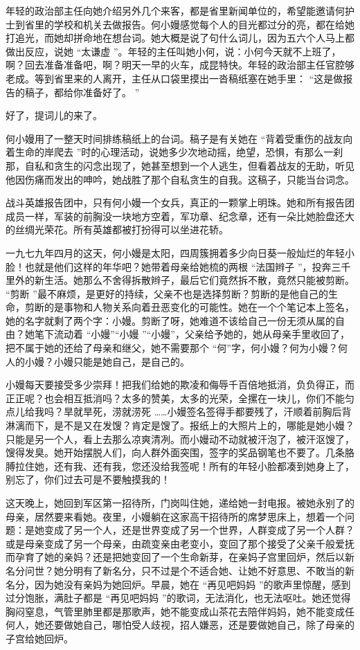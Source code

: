 \documentclass[12pt,twoside,openany]{book}
\begin{document}
年轻的政治部主任向她介绍另外几个来客，都是省里新闻单位的，希望能邀请何护士到省里的学校和机关去做报告。何小嫚感觉每个人的目光都过分的亮，都在给她打追光，而她却拼命地在想台词。她大概是说了句什么词儿，因为五六个人马上都做出反应，说她 “太谦虚 ”。年轻的主任叫她小何，说：小何今天就不上班了，啊？回去准备准备吧，啊？明天一早的火车，成昆特快。年轻的政治部主任官腔够老成。等到省里来的人离开，主任从口袋里摸出一沓稿纸塞在她手里： “这是做报告的稿子，都给你准备好了。 ”

好了，提词儿的来了。

何小嫚用了一整天时间排练稿纸上的台词。稿子是有关她在 “背着受重伤的战友向着生命的岸爬去 ”时的心理活动，说她多少次地动摇，绝望，恐惧，有那么一刹那，自私和贪生的闪念出现了，她甚至想到一个人逃生，但看着战友的无助，听见他因伤痛而发出的呻吟，她战胜了那个自私贪生的自我。这稿子，只能当台词念。

战斗英雄报告团中，只有何小嫚一个女兵，真正的一颗掌上明珠。她和所有报告团成员一样，军装的前胸没一块地方空着，军功章、纪念章，还有一朵比她脸盘还大的丝绸光荣花。所有英雄都被打扮得可以坐进花轿。

一九七九年四月的这天，何小嫚是太阳，四周簇拥着多少向日葵一般灿烂的年轻小脸！也就是他们这样的年华吧？她带着母亲给她梳的两根 “法国辫子 ”，投奔三千里外的新生活。她那么不舍得拆散辫子，最后它们竟然拆不散，竟然只能被剪断。 “剪断 ”最不麻烦，是更好的持续，父亲不也是选择剪断？剪断的是他自己的生命，剪断的是事物和人物关系向着丑恶变化的可能性。她在一个个笔记本上签名，她的名字就剩了两个字：小嫚。剪断了呀，她难道不该给自己一份无须从属的自由？她笔下流动着 “小嫚”“小嫚 ”“小嫚”，父亲给予她的，她从母亲手里收回了，把不属于她的还给了母亲和继父，她不需要那个 “何”字，何小嫚？何为小嫚？何人的小嫚？小嫚只能是她自己，是自己的。

小嫚每天要接受多少崇拜！把我们给她的欺凌和侮辱千百倍地抵消，负负得正，而正正呢？也会相互抵消吗？太多的赞美，太多的光荣，全摞在一块儿，你们不能匀点儿给我吗？旱就旱死，涝就涝死 ……小嫚签名签得手都要残了，汗顺着前胸后背淋漓而下，是不是又在发馊？肯定是馊了。报纸上的大照片上的，哪能是她小嫚？只能是另一个人，看上去那么凉爽清冽。而小嫚动不动就被汗泡了，被汗沤馊了，馊得发臭。她开始摆脱人们，向人群外面突围，签字的奖品钢笔也不要了。几条胳膊拉住她，还有我、还有我，您还没给我签呢！所有的年轻小脸都凑到她身上了，别忘了，你们过去可是不要触摸我的！

这天晚上，她回到军区第一招待所，门岗叫住她，递给她一封电报。被她永别了的母亲，居然要来看她。夜里，小嫚躺在这家高干招待所的席梦思床上，想着一个问题：是她变成了另一个人，还是世界变成了另一个世界，人群变成了另一个人群？或是母亲变成了另一个母亲，由疏变亲由老变小，变回了那个接受了父亲千般爱抚而孕育了她的亲妈？还是把她变回了一个生命新芽，在亲妈子宫里回炉，然后以新名分问世？她分明有了新名分，只不过是个不适合她、让她不好意思、不敢当的新名分，因为她没有亲妈为她回炉。早晨，她在 “再见吧妈妈 ”的歌声里惊醒，感到过分饱胀，满肚子都是 “再见吧妈妈 ”的歌词，无法消化，也无法呕吐。她还觉得胸闷窒息，气管里肺里都是那歌声，她不能变成山茶花去陪伴妈妈，她不能变成任何人，她还要做她自己，哪怕受人歧视，招人嫌恶，还是要做她自己，除了母亲的子宫给她回炉。
\end{document}

